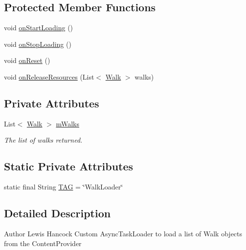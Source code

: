 \subsection*{Protected Member Functions}
\begin{DoxyCompactItemize}
\item 
void \hyperlink{classuk_1_1ac_1_1swan_1_1digitaltrails_1_1sync_1_1_walk_loader_aa45381e4d22f376794110d36e6255dbe}{on\+Start\+Loading} ()
\item 
void \hyperlink{classuk_1_1ac_1_1swan_1_1digitaltrails_1_1sync_1_1_walk_loader_aa7af819c0f973cad6b08e4a8421559ea}{on\+Stop\+Loading} ()
\item 
void \hyperlink{classuk_1_1ac_1_1swan_1_1digitaltrails_1_1sync_1_1_walk_loader_a4128676b76295beb82484cbb839650d4}{on\+Reset} ()
\item 
void \hyperlink{classuk_1_1ac_1_1swan_1_1digitaltrails_1_1sync_1_1_walk_loader_a0ff848242b7ab72e395edd6b7f71bb6c}{on\+Release\+Resources} (List$<$ \hyperlink{classuk_1_1ac_1_1swan_1_1digitaltrails_1_1components_1_1_walk}{Walk} $>$ walks)
\end{DoxyCompactItemize}
\subsection*{Private Attributes}
\begin{DoxyCompactItemize}
\item 
List$<$ \hyperlink{classuk_1_1ac_1_1swan_1_1digitaltrails_1_1components_1_1_walk}{Walk} $>$ \hyperlink{classuk_1_1ac_1_1swan_1_1digitaltrails_1_1sync_1_1_walk_loader_ac5ec0db2ebe335c772002d7815c137f7}{m\+Walks}
\begin{DoxyCompactList}\small\item\em The list of walks returned. \end{DoxyCompactList}\end{DoxyCompactItemize}
\subsection*{Static Private Attributes}
\begin{DoxyCompactItemize}
\item 
static final String \hyperlink{classuk_1_1ac_1_1swan_1_1digitaltrails_1_1sync_1_1_walk_loader_aa1258f0cd574d97f8f930ebd74afa4a6}{T\+A\+G} = \char`\"{}Walk\+Loader\char`\"{}
\end{DoxyCompactItemize}


\subsection{Detailed Description}
\begin{DoxyAuthor}{Author}
Lewis Hancock Custom Async\+Task\+Loader to load a list of Walk objects from the Content\+Provider 
\end{DoxyAuthor}


